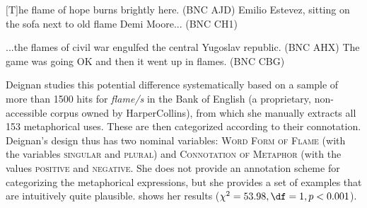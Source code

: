 \begin{exe}
\ex
\begin{xlist}
\label{ex:flamemet}
\ex $[$T$]$he flame of hope burns brightly here. (BNC AJD)
\ex Emilio Estevez, sitting on the sofa next to old flame Demi Moore... (BNC CH1)
\end{xlist}
\end{exe}

\begin{exe}
\ex
\begin{xlist}
\label{ex:flamesmet}
\ex ...the flames of civil war engulfed the central Yugoslav republic. (BNC AHX)
\ex The game was going OK and then it went up in flames. (BNC CBG)
\end{xlist}
\end{exe}

Deignan studies this potential difference systematically based on a sample of more than 1500 hits for \textit{flame/s} in the Bank of English (a proprietary, non\hyp{}accessible corpus owned by HarperCollins), from which she manually  extracts  all 153 metaphorical uses. These are then categorized  according to their connotation.  Deignan's design  thus has two nominal  variables: \textsc{Word Form of Flame} (with the variables \textsc{singular} and \textsc{plural})  and \textsc{Connotation of Metaphor}  (with the values \textsc{positive} and \textsc{negative}. She does not provide an annotation  scheme for categorizing  the metaphorical expressions, but she provides a set of examples that are intuitively quite plausible.  shows her results ($\chi^2 = 53.98, \df = 1, p < 0.001$).

